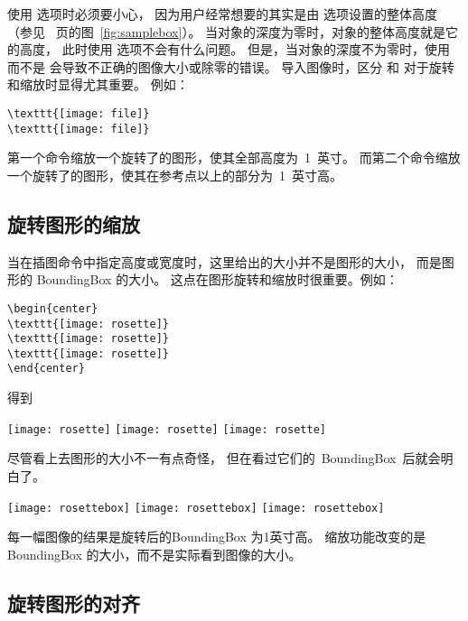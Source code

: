使用  选项时必须要小心，
因为用户经常想要的其实是由  选项设置的整体高度
（参见~\pageref{fig:samplebox} 页的图~\ref{fig:samplebox}）。
当对象的深度为零时，对象的整体高度就是它的高度，
此时使用  选项不会有什么问题。
但是，当对象的深度不为零时，使用  而不是  会导致不正确的图像大小或除零的错误。
导入图像时，区分  和  对于旋转和缩放时显得尤其重要。
例如：
\begin{lstlisting}
\texttt{[image: file]}
\texttt{[image: file]}
\end{lstlisting}
第一个命令缩放一个旋转了的图形，使其全部高度为~1~英寸。
而第二个命令缩放一个旋转了的图形，使其在参考点以上的部分为~1~英寸高。

\subsection{旋转图形的缩放}\label{ssec:enlarge}
当在插图命令中指定高度或宽度时，这里给出的大小并不是图形的大小，
而是图形的 BoundingBox 的大小。
这点在图形旋转和缩放时很重要。例如：
\begin{lstlisting}
\begin{center}
\texttt{[image: rosette]}
\texttt{[image: rosette]}
\texttt{[image: rosette]}
\end{center}
\end{lstlisting}
得到

\begin{center}
	\texttt{[image: rosette]}
	\texttt{[image: rosette]}
	\texttt{[image: rosette]}
\end{center}
尽管看上去图形的大小不一有点奇怪，
但在看过它们的~BoundingBox~后就会明白了。

\begin{center}
	\texttt{[image: rosettebox]}
	\texttt{[image: rosettebox]}
	\texttt{[image: rosettebox]}
\end{center}
每一幅图像的结果是旋转后的BoundingBox 为1英寸高。
缩放功能改变的是BoundingBox 的大小，而不是实际看到图像的大小。


\subsection{旋转图形的对齐}\label{ssec:ralign}

